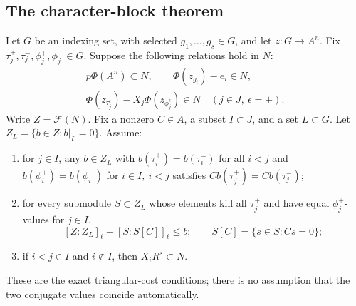 \documentclass[11pt,a4paper]{article}
\theoremstyle{definition}
\begin{document}
\subsection{The character-block theorem}
Let \(G\) be an indexing set, with selected
\(g_1,\ldots,g_s\in G\), and let
\(z:G\to A^n\). Fix
\(\tau_j^+,\tau_j^-,\phi_j^+,\phi_j^-\in G\).
Suppose the following relations hold in \(N\):
\begin{equation}\label{eq:character-presentation}
 \begin{gathered}
 p\Phi(A^n)\subset N,\qquad
 \Phi(z_{g_i})-e_i\in N,\\
 \Phi(z_{\tau_j^\epsilon})-
                   X_j\Phi(z_{\phi_j^\epsilon})\in N
                                  \quad(j\in J,\ \epsilon=\pm).
 \end{gathered}
\end{equation}
Write \(Z=\mathcal F(N)\). Fix a nonzero \(C\in A\),
a subset \(I\subset J\), and a set \(L\subset G\).
Let \(Z_L=\{b\in Z:b|_L=0\}\).
Assume:
\begin{enumerate}[label=(\roman*)]
\item for \(j\in I\), any \(b\in Z_L\) with
\(b(\tau_i^+)=b(\tau_i^-)\) for all \(i<j\)
and \(b(\phi_i^+)=b(\phi_i^-)\) for \(i\in I,\ i<j\)
satisfies
\(C b(\tau_j^+)=C b(\tau_j^-)\);
\item for every submodule \(S\subset Z_L\) whose
elements kill all \(\tau_j^\pm\) and have equal
\(\phi_j^\pm\)-values for \(j\in I\),
\[
 [Z:Z_L]_\ell+[S:S[C]]_\ell\le b;
 \qquad S[C]=\{s\in S:Cs=0\};
\]
\item if \(i<j\in I\) and \(i\notin I\), then
\(X_iR^s\subset N\).
\end{enumerate}
These are the exact triangular-cost conditions;
there is no assumption that the two conjugate
values coincide automatically.
\end{document}

